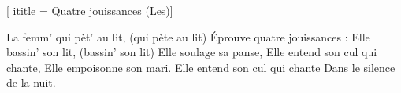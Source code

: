  [
ititle = {Quatre jouissances (Les)}]

\beginverse
La femm' qui pèt' au lit, (qui pète au lit)
Éprouve quatre jouissances :
Elle bassin' son lit, (bassin' son lit)
Elle soulage sa panse,
Elle entend son cul qui chante,
Elle empoisonne son mari.
Elle entend son cul qui chante
Dans le silence de la nuit.
\endverse

\endsong